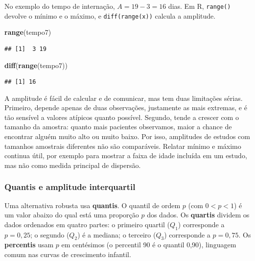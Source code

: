 \documentclass[
]{book}
\newenvironment{Shaded}{\begin{snugshade}}{\end{snugshade}}
\newcommand{\FunctionTok}[1]{\textcolor[rgb]{0.13,0.29,0.53}{\textbf{#1}}}
\newcommand{\NormalTok}[1]{#1}
\begin{document}
No exemplo do tempo de internação, \(A = 19 - 3 = 16\) dias. Em R, \texttt{range()} devolve o mínimo e o máximo, e \texttt{diff(range(x))} calcula a amplitude.

\begin{Shaded}
\begin{Highlighting}[]
\FunctionTok{range}\NormalTok{(tempo7)}
\end{Highlighting}
\end{Shaded}

\begin{verbatim}
## [1]  3 19
\end{verbatim}

\begin{Shaded}
\begin{Highlighting}[]
\FunctionTok{diff}\NormalTok{(}\FunctionTok{range}\NormalTok{(tempo7))}
\end{Highlighting}
\end{Shaded}

\begin{verbatim}
## [1] 16
\end{verbatim}

A amplitude é fácil de calcular e de comunicar, mas tem duas limitações sérias. Primeiro, depende apenas de duas observações, justamente as mais extremas, e é tão sensível a valores atípicos quanto possível. Segundo, tende a crescer com o tamanho da amostra: quanto mais pacientes observamos, maior a chance de encontrar alguém muito alto ou muito baixo. Por isso, amplitudes de estudos com tamanhos amostrais diferentes não são comparáveis. Relatar mínimo e máximo continua útil, por exemplo para mostrar a faixa de idade incluída em um estudo, mas não como medida principal de dispersão.

\subsubsection{Quantis e amplitude interquartil}\label{desc-quantis}

Uma alternativa robusta usa \textbf{quantis}. O quantil de ordem \(p\) (com \(0 < p < 1\)) é um valor abaixo do qual está uma proporção \(p\) dos dados. Os \textbf{quartis} dividem os dados ordenados em quatro partes: o primeiro quartil (\(Q_1\)) corresponde a \(p = 0{,}25\); o segundo (\(Q_2\)) é a mediana; o terceiro (\(Q_3\)) corresponde a \(p = 0{,}75\). Os \textbf{percentis} usam \(p\) em centésimos (o percentil 90 é o quantil 0,90), linguagem comum nas curvas de crescimento infantil.
\end{document}
